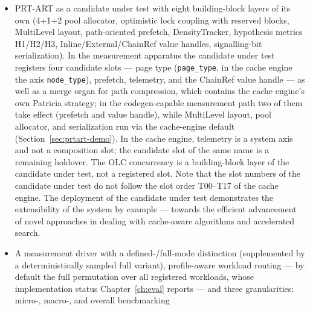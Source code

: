 \begin{itemize}
  30~full profiles of standalone search designs --- 8~Rank-1 and 22~Rank-2/3 --- as well as 3~abstract profiles
  (OLC, LOUDS, VAMPIR), which enter only dissected, as organs or as measurement technology. The
  \texttt{ExperimentDriver} transforms them automatically into pre-compiled C++23 modules; the profile set
  thereby covers all 33 analysed publications. By means of the
  cache engine, the XML design genuinely maps the individual algorithm constituents at compile time and is thereby a
  compiler-compiler build recipe within a \emph{model-driven} optimization
  stack~\cite{schmidt2006modeldriven}; that declarative configuration descriptions drive the
  automated construction of modular system variants is an established
  construct~\cite{czarnecki2000generative, apel2013feature}.
  \item PRT-ART as a candidate under test with eight building-block layers of its own (4+1+2 pool allocator, optimistic
  lock coupling with reserved blocks, MultiLevel layout, path-oriented prefetch,
  DensityTracker, hypothesis metrics H1/H2/H3, Inline/External/ChainRef value handles,
  signalling-bit serialization). In the measurement apparatus the candidate under test registers four candidate slots --- page type
  (\texttt{page\_type}, in the cache engine the axis \texttt{node\_type}), prefetch, telemetry, and the
  ChainRef value handle --- as well as a merge organ for path compression, which contains the cache engine's own
  Patricia strategy; in the codegen-capable measurement path two of them take effect (prefetch and
  value handle), while MultiLevel layout, pool allocator, and serialization run via the
  cache-engine default (Section~\ref{sec:prtart-demo}). In the cache engine, telemetry is
  a system axis and not a composition slot; the candidate slot of the same name is a
  remaining holdover. The OLC concurrency is a building-block layer of the candidate under test, not a registered slot.
  Note that the slot numbers of the candidate under test do not follow the slot order T00--T17 of the
  cache engine. The deployment of the candidate under test demonstrates the extensibility of the system by example ---
  towards the efficient advancement of novel approaches in dealing with cache-aware algorithms and
  accelerated search.
  \item A measurement driver with a defined-/full-mode distinction (supplemented by a deterministically
  sampled full variant), profile-aware workload routing --- by default the full permutation over all registered workloads, whose implementation status
  Chapter~\ref{ch:eval} reports --- and three granularities: micro-, macro-, and overall benchmarking

\end{itemize}
